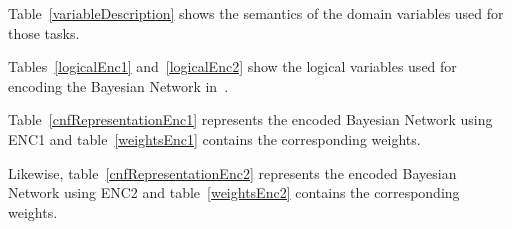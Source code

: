 Table~\ref{variableDescription} shows the semantics of the domain variables used for those tasks.


Tables~\ref{logicalEnc1} and~\ref{logicalEnc2} show the logical variables used for encoding the Bayesian Network in~\cite{bayesian_network}.



Table~\ref{cnfRepresentationEnc1} represents the encoded Bayesian Network using ENC1 and table~\ref{weightsEnc1} contains the corresponding weights.
%



Likewise, table~\ref{cnfRepresentationEnc2} represents the encoded Bayesian Network using ENC2 and table~\ref{weightsEnc2} contains the corresponding weights.
%

